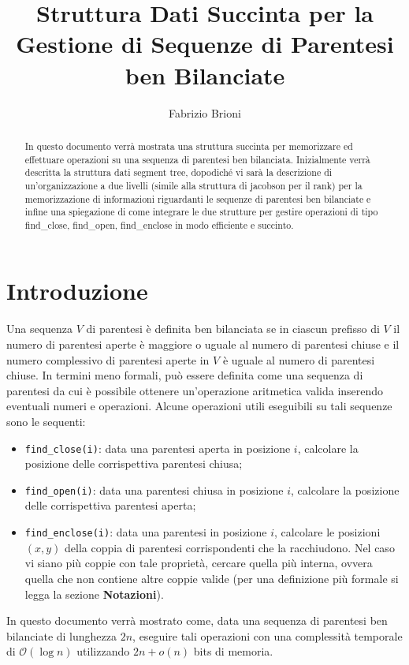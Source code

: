 \documentclass{article}
\title{Struttura Dati Succinta per la Gestione di Sequenze di Parentesi ben Bilanciate}
\author{Fabrizio Brioni}
\begin{document}
\maketitle

\begin{abstract}
In questo documento verrà mostrata una struttura succinta per memorizzare ed effettuare operazioni su una sequenza di parentesi ben bilanciata. Inizialmente verrà descritta la struttura dati segment tree, dopodiché vi sarà la descrizione di un'organizzazione a due livelli (simile alla struttura di jacobson per il rank) per la memorizzazione di informazioni riguardanti le sequenze di parentesi ben bilanciate e infine una spiegazione di come integrare le due strutture per gestire operazioni di tipo find\_close, find\_open, find\_enclose in modo efficiente e succinto.
\end{abstract}

\section{Introduzione}
Una sequenza $V$ di parentesi è definita ben bilanciata se in ciascun prefisso di $V$ il numero di parentesi aperte è maggiore o uguale al numero di parentesi chiuse e il numero complessivo di parentesi aperte in $V$ è uguale al numero di parentesi chiuse. In termini meno formali, può essere definita come una sequenza di parentesi da cui è possibile ottenere un'operazione aritmetica valida inserendo eventuali numeri e operazioni. Alcune operazioni utili eseguibili su tali sequenze sono le sequenti:
    \begin{itemize}
    \item \texttt{find\_close(i)}: data una parentesi aperta in posizione $i$, calcolare la posizione delle corrispettiva parentesi chiusa;
    \item \texttt{find\_open(i)}: data una parentesi chiusa in posizione $i$, calcolare la posizione delle corrispettiva parentesi aperta;
    \item \texttt{find\_enclose(i)}: data una parentesi in posizione $i$, calcolare le posizioni $(x,y)$ della coppia di parentesi corrispondenti che la racchiudono. Nel caso vi siano più coppie con tale proprietà, cercare quella più interna, ovvera quella che non contiene altre coppie valide (per una definizione più formale si legga la sezione \textbf{Notazioni}). 
    \end{itemize}
In questo documento verrà mostrato come, data una sequenza di parentesi ben bilanciate di lunghezza $2n$, eseguire tali operazioni con una complessità temporale di $\mathcal{O}(\log{n})$ utilizzando $2n + o(n)$ bits di memoria.
\end{document}
